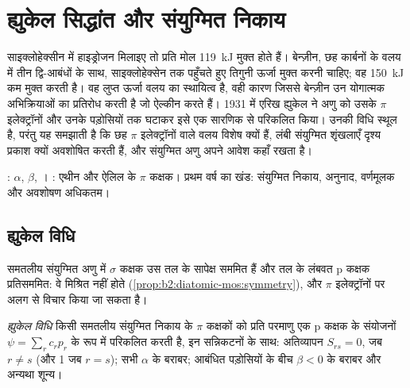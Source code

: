 \chapter{ह्युकेल सिद्धांत और संयुग्मित निकाय}\label{ch:b2:huckel}

साइक्लोहेक्सीन में हाइड्रोजन मिलाइए तो प्रति मोल \qty{119}{kJ} मुक्त होते हैं। बेन्ज़ीन,
छह कार्बनों के वलय में तीन द्वि-आबंधों के साथ, साइक्लोहेक्सेन तक पहुँचते हुए
तिगुनी ऊर्जा मुक्त करनी चाहिए; वह \qty{150}{kJ} कम मुक्त करती है। वह लुप्त
ऊर्जा  वलय का स्थायित्व है, वही कारण जिससे बेन्ज़ीन
उन योगात्मक अभिक्रियाओं का प्रतिरोध करती है जो ऐल्कीन करते हैं। 1931 में एरिख ह्युकेल ने अणु को
उसके $\pi$ इलेक्ट्रॉनों और उनके पड़ोसियों तक घटाकर इसे एक सारणिक से
परिकलित किया। उनकी विधि स्थूल है, परंतु यह समझाती है कि छह $\pi$
इलेक्ट्रॉनों वाले वलय विशेष क्यों हैं, लंबी संयुग्मित शृंखलाएँ दृश्य प्रकाश क्यों अवशोषित करती हैं, और
संयुग्मित अणु अपने आवेश कहाँ रखता है।

\begin{recall}
:  $\alpha$,  $\beta$,
। : एथीन और
ऐलिल के $\pi$ कक्षक। प्रथम वर्ष का खंड: संयुग्मित निकाय, अनुनाद, वर्णमूलक और
अवशोषण अधिकतम।
\end{recall}

\section{ह्युकेल विधि}

समतलीय संयुग्मित अणु में $\sigma$ कक्षक उस तल के सापेक्ष सममित हैं और तल के लंबवत p
कक्षक प्रतिसममित: वे मिश्रित नहीं होते
(\cref{prop:b2:diatomic-mos:symmetry}), और $\pi$ इलेक्ट्रॉनों पर
अलग से विचार किया जा सकता है।

\begin{definition}[ह्युकेल विधि]\label{def:b2:huckel:method}
\emph{ह्युकेल विधि} किसी
समतलीय संयुग्मित निकाय के $\pi$ कक्षकों को प्रति परमाणु एक p कक्षक के संयोजनों $\psi = \sum_r c_r p_r$ के रूप में
परिकलित करती है, इन सन्निकटनों के साथ: अतिव्यापन $S_{rs} = 0$, जब $r \neq s$ (और 1 जब $r =
s$); सभी  $\alpha$ के बराबर;  आबंधित पड़ोसियों के बीच
$\beta < 0$ के बराबर और अन्यथा शून्य।
\end{definition}

